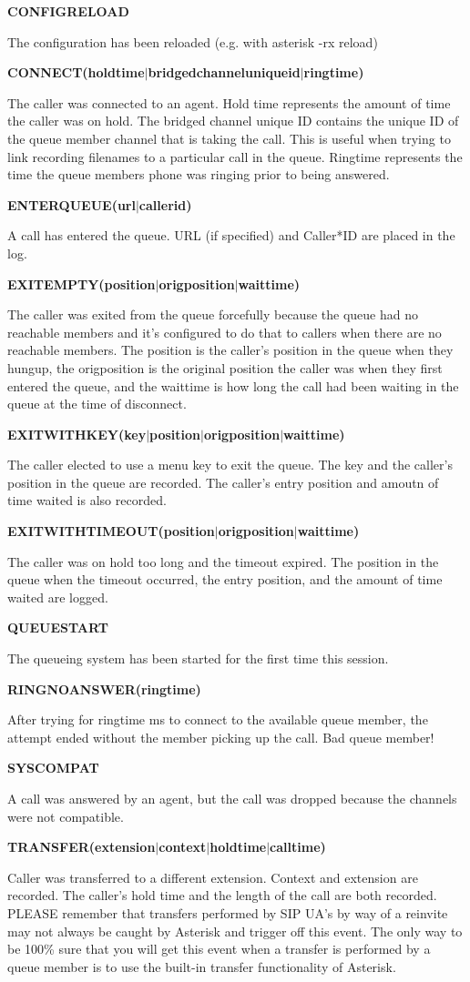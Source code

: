 \textbf{CONFIGRELOAD}

The configuration has been reloaded (e.g. with asterisk -rx reload)

\textbf{CONNECT(holdtime$|$bridgedchanneluniqueid$|$ringtime)}

The caller was connected to an agent.  Hold time represents the amount
of time the caller was on hold. The bridged channel unique ID contains
the unique ID of the queue member channel that is taking the call. This
is useful when trying to link recording filenames to a particular
call in the queue. Ringtime represents the time the queue members phone
was ringing prior to being answered.

\textbf{ENTERQUEUE(url$|$callerid)}

A call has entered the queue.  URL (if specified) and Caller*ID are placed
in the log.

\textbf{EXITEMPTY(position$|$origposition$|$waittime)}

The caller was exited from the queue forcefully because the queue had no
reachable members and it's configured to do that to callers when there
are no reachable members. The position is the caller's position in the
queue when they hungup, the origposition is the original position the
caller was when they first entered the queue, and the waittime is how
long the call had been waiting in the queue at the time of disconnect.

\textbf{EXITWITHKEY(key$|$position$|$origposition$|$waittime)}

The caller elected to use a menu key to exit the queue.  The key and
the caller's position in the queue are recorded.  The caller's entry
position and amoutn of time waited is also recorded.

\textbf{EXITWITHTIMEOUT(position$|$origposition$|$waittime)}

The caller was on hold too long and the timeout expired.  The position in the
queue when the timeout occurred, the entry position, and the amount of time
waited are logged.

\textbf{QUEUESTART}

The queueing system has been started for the first time this session.

\textbf{RINGNOANSWER(ringtime)}

After trying for ringtime ms to connect to the available queue member,
the attempt ended without the member picking up the call. Bad queue
member!

\textbf{SYSCOMPAT}

A call was answered by an agent, but the call was dropped because the
channels were not compatible.

\textbf{TRANSFER(extension$|$context$|$holdtime$|$calltime)}

Caller was transferred to a different extension.  Context and extension
are recorded. The caller's hold time and the length of the call are both
recorded. PLEASE remember that transfers performed by SIP UA's by way
of a reinvite may not always be caught by Asterisk and trigger off this
event. The only way to be 100\% sure that you will get this event when
a transfer is performed by a queue member is to use the built-in transfer
functionality of Asterisk.

